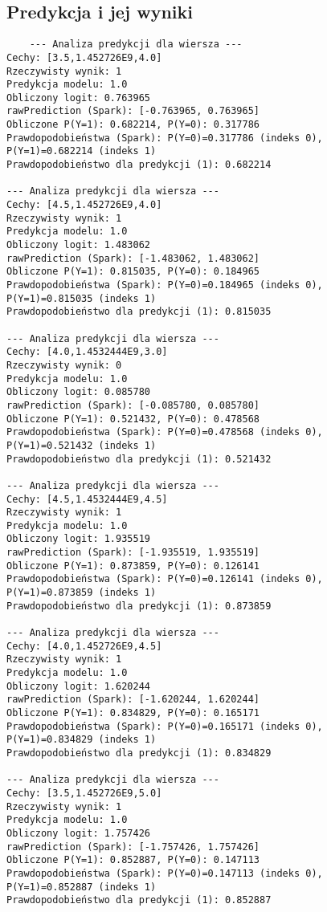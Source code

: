 \documentclass{article}
\begin{document}
\subsection{Predykcja i jej wyniki}
\begin{verbatim}
    --- Analiza predykcji dla wiersza ---
Cechy: [3.5,1.452726E9,4.0]
Rzeczywisty wynik: 1
Predykcja modelu: 1.0
Obliczony logit: 0.763965
rawPrediction (Spark): [-0.763965, 0.763965]
Obliczone P(Y=1): 0.682214, P(Y=0): 0.317786
Prawdopodobieństwa (Spark): P(Y=0)=0.317786 (indeks 0), P(Y=1)=0.682214 (indeks 1)
Prawdopodobieństwo dla predykcji (1): 0.682214

--- Analiza predykcji dla wiersza ---
Cechy: [4.5,1.452726E9,4.0]
Rzeczywisty wynik: 1
Predykcja modelu: 1.0
Obliczony logit: 1.483062
rawPrediction (Spark): [-1.483062, 1.483062]
Obliczone P(Y=1): 0.815035, P(Y=0): 0.184965
Prawdopodobieństwa (Spark): P(Y=0)=0.184965 (indeks 0), P(Y=1)=0.815035 (indeks 1)
Prawdopodobieństwo dla predykcji (1): 0.815035

--- Analiza predykcji dla wiersza ---
Cechy: [4.0,1.4532444E9,3.0]
Rzeczywisty wynik: 0
Predykcja modelu: 1.0
Obliczony logit: 0.085780
rawPrediction (Spark): [-0.085780, 0.085780]
Obliczone P(Y=1): 0.521432, P(Y=0): 0.478568
Prawdopodobieństwa (Spark): P(Y=0)=0.478568 (indeks 0), P(Y=1)=0.521432 (indeks 1)
Prawdopodobieństwo dla predykcji (1): 0.521432

--- Analiza predykcji dla wiersza ---
Cechy: [4.5,1.4532444E9,4.5]
Rzeczywisty wynik: 1
Predykcja modelu: 1.0
Obliczony logit: 1.935519
rawPrediction (Spark): [-1.935519, 1.935519]
Obliczone P(Y=1): 0.873859, P(Y=0): 0.126141
Prawdopodobieństwa (Spark): P(Y=0)=0.126141 (indeks 0), P(Y=1)=0.873859 (indeks 1)
Prawdopodobieństwo dla predykcji (1): 0.873859

--- Analiza predykcji dla wiersza ---
Cechy: [4.0,1.452726E9,4.5]
Rzeczywisty wynik: 1
Predykcja modelu: 1.0
Obliczony logit: 1.620244
rawPrediction (Spark): [-1.620244, 1.620244]
Obliczone P(Y=1): 0.834829, P(Y=0): 0.165171
Prawdopodobieństwa (Spark): P(Y=0)=0.165171 (indeks 0), P(Y=1)=0.834829 (indeks 1)
Prawdopodobieństwo dla predykcji (1): 0.834829

--- Analiza predykcji dla wiersza ---
Cechy: [3.5,1.452726E9,5.0]
Rzeczywisty wynik: 1
Predykcja modelu: 1.0
Obliczony logit: 1.757426
rawPrediction (Spark): [-1.757426, 1.757426]
Obliczone P(Y=1): 0.852887, P(Y=0): 0.147113
Prawdopodobieństwa (Spark): P(Y=0)=0.147113 (indeks 0), P(Y=1)=0.852887 (indeks 1)
Prawdopodobieństwo dla predykcji (1): 0.852887


\end{verbatim}
\end{document}
